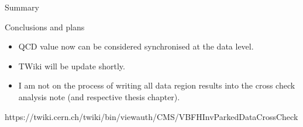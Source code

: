 \documentclass[8pt]{beamer}
\begin{document}
\begin{frame}{Summary}

\begin{block}{Conclusions and plans}
 


\begin{itemize}
  \item QCD value now can be considered synchronised at the data level.
  \item TWiki will be update shortly.
  \item I am not on the process of writing all data region results into the cross check analysis note (and respective thesis chapter).
\end{itemize}

\end{block}

\begin{center}
https://twiki.cern.ch/twiki/bin/viewauth/CMS/VBFHInvParkedDataCrossCheck
\end{center}

\end{frame}
\end{document}
